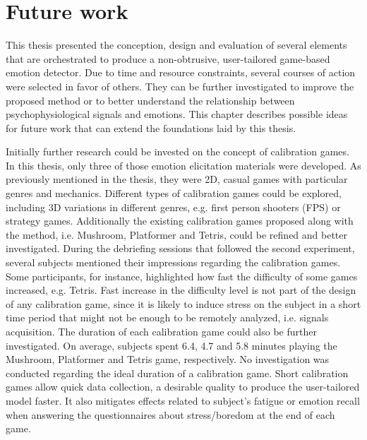 \chapter{Future work}
\label{ch:closing}

This thesis presented the conception, design and evaluation of several elements that are orchestrated to produce a non-obtrusive, user-tailored game-based emotion detector. Due to time and resource constraints, several courses of action were selected in favor of others. They can be further investigated to improve the proposed method or to better understand the relationship between psychophysiological signals and emotions. This chapter describes possible ideas for future work that can extend the foundations laid by this thesis.

Initially further research could be invested on the concept of calibration games. In this thesis, only three of those emotion elicitation materials were developed. As previously mentioned in the thesis, they were 2D, casual games with particular genres and mechanics. Different types of calibration games could be explored, including 3D variations in different genres, e.g. first person shooters (FPS) or strategy games. Additionally the existing calibration games proposed along with the method, i.e. Mushroom, Platformer and Tetris, could be refined and better investigated. During the debriefing sessions that followed the second experiment, several subjects mentioned their impressions regarding the calibration games. Some participants, for instance, highlighted how fast the difficulty of some games increased, e.g. Tetris. Fast increase in the difficulty level is not part of the design of any calibration game, since it is likely to induce stress on the subject in a short time period that might not be enough to be remotely analyzed, i.e. signals acquisition. The duration of each calibration game could also be further investigated. On average, subjects spent 6.4, 4.7 and 5.8 minutes playing the Mushroom, Platformer and Tetris game, respectively. No investigation was conducted regarding the ideal duration of a calibration game. Short calibration games allow quick data collection, a desirable quality to produce the user-tailored model faster. It also mitigates effects related to subject's fatigue or emotion recall when answering the questionnaires about stress/boredom at the end of each game.

